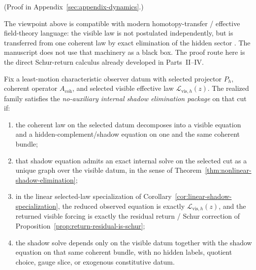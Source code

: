 (Proof in Appendix~\ref{sec:appendix-dynamics}.)

\begin{remark}
\label{rem:exact-elimination-and-transfer}
The viewpoint above is compatible with modern homotopy-transfer / effective
field-theory language: the visible law is not postulated independently, but is
transferred from one coherent law by exact elimination of the hidden sector
\cite{ArvanitakisHohmHullLekeu2020}. The manuscript does not use that machinery
as a black box. The proof route here is the direct Schur-return calculus
already developed in Parts~II--IV.
\end{remark}

\begin{definition}
\label{def:no-auxiliary-internal-shadow-elimination-package}
Fix a least-motion characteristic observer datum with selected projector
\(P_h\), coherent operator \(A_{\mathrm{coh}}\), and selected visible
effective law \(\mathcal L_{\mathrm{vis},h}(z)\). The realized family
satisfies the \emph{no-auxiliary internal shadow elimination package} on that
cut if:
\begin{enumerate}[label=(\roman*), leftmargin=2em, itemsep=0.2em]
\item the coherent law on the selected datum decomposes into a visible equation
      and a hidden-complement/shadow equation on one and the same coherent
      bundle;
\item that shadow equation admits an exact internal solve on the selected cut
      as a unique graph over the visible datum, in the sense of
      Theorem~\ref{thm:nonlinear-shadow-elimination};
\item in the linear selected-law specialization of
      Corollary~\ref{cor:linear-shadow-specialization}, the reduced observed
      equation is exactly \(\mathcal L_{\mathrm{vis},h}(z)\), and the returned
      visible forcing is exactly the residual return / Schur correction of
      Proposition~\ref{prop:return-residual-is-schur};
\item the shadow solve depends only on the visible datum together with the
      shadow equation on that same coherent bundle, with no hidden labels,
      quotient choice, gauge slice, or exogenous constitutive datum.
\end{enumerate}
\end{definition}

